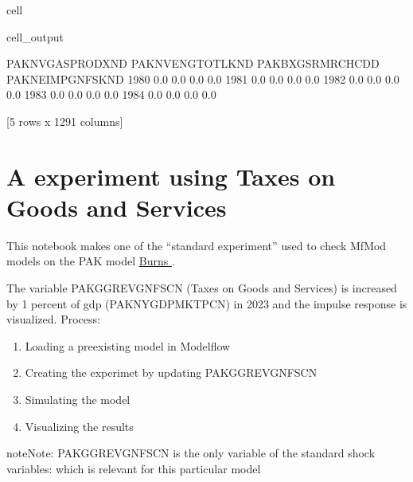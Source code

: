 \documentclass[letterpaper,10pt,english]{jupyterBook}
\begin{document}
\begin{sphinxuseclass}{cell}
\begin{sphinxVerbatimOutput}
\begin{sphinxuseclass}{cell_output}
\begin{sphinxVerbatim}[commandchars=\\\{\}]
      PAKNVGASPRODXN\PYGZus{}D  PAKNVENGTOTLKN\PYGZus{}D  PAKBXGSRMRCHCD\PYGZus{}D  PAKNEIMPGNFSKN\PYGZus{}D  
1980               0.0               0.0               0.0               0.0  
1981               0.0               0.0               0.0               0.0  
1982               0.0               0.0               0.0               0.0  
1983               0.0               0.0               0.0               0.0  
1984               0.0               0.0               0.0               0.0  

[5 rows x 1291 columns]
\end{sphinxVerbatim}

\end{sphinxuseclass}\end{sphinxVerbatimOutput}

\end{sphinxuseclass}
\sphinxstepscope


\chapter{A experiment using Taxes on Goods and Services}
\label{\detokenize{content/howto/experiments/Standard experiment simple:a-experiment-using-taxes-on-goods-and-services}}\label{\detokenize{content/howto/experiments/Standard experiment simple::doc}}
\sphinxAtStartPar
This notebook makes one of the “standard experiment” used to check MfMod models on the PAK model \hyperlink{cite.content/litterature:id14}{Burns } .

\sphinxAtStartPar
The variable PAKGGREVGNFSCN (Taxes on Goods and Services) is increased by 1 percent of gdp (PAKNYGDPMKTPCN) in 2023 and the impulse response is visualized.
Process:
\begin{enumerate}
%
\item {} 
\sphinxAtStartPar
Loading a pre\sphinxhyphen{}existing model in Modelflow

\item {} 
\sphinxAtStartPar
Creating the experimet by updating PAKGGREVGNFSCN

\item {} 
\sphinxAtStartPar
Simulating the model

\item {} 
\sphinxAtStartPar
Visualizing the results

\end{enumerate}

\begin{sphinxadmonition}{note}{Note:}
\sphinxAtStartPar
PAKGGREVGNFSCN is the only variable of the standard shock variables:  which is relevant for this particular model
\end{sphinxadmonition}
\end{document}

